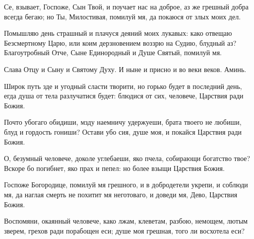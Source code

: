 \begin{mymulticols}
Се, взывает, Госпоже, Сын Твой, и поучает нас на доброе, аз же грешный добра всегда бегаю; но Ты, Милостивая, помилуй мя, да покаюся от злых моих дел.


Помышляю день страшный и плачуся деяний моих лукавых: како отвещаю Безсмертному Царю, или коим дерзновением воззрю на Судию, блудный аз? Благоутробный Отче, Сыне Единородный и Душе Святый, помилуй мя.

Слава Отцу и Сыну и Святому Духу. И ныне и присно и во веки веков. Аминь.





Широк путь зде и угодный сласти творити, но горько будет в последний день, егда душа от тела разлучатися будет: блюдися от сих, человече, Царствия ради Божия.


Почто убогаго обидиши, мзду наемничу удержуеши, брата твоего не любиши, блуд и гордость гониши? Остави убо сия, душе моя, и покайся Царствия ради Божия.

\slava

О, безумный человече, доколе углебаеши, яко пчела, собирающи богатство твое? Вскоре бо погибнет, яко прах и пепел: но более взыщи Царствия Божия.

\inyne

Госпоже Богородице, помилуй мя грешного, и в добродетели укрепи, и соблюди мя, да наглая смерть не похитит мя неготоваго, и доведи мя, Дево, Царствия Божия.




Воспомяни, окаянный человече, како лжам, клеветам, разбою, немощем, лютым зверем, грехов ради порабощен еси; душе моя грешная, того ли восхотела еси?


\end{mymulticols}
